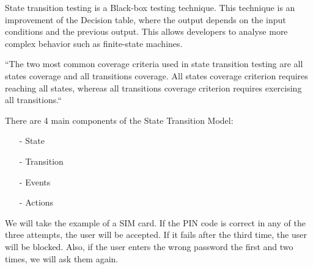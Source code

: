 State transition testing is a Black-box testing technique. This technique is an improvement of the Decision table, where the output depends on the input conditions and the previous output. This allows developers to analyse more complex behavior such as finite-state machines.

``The two most common coverage criteria used in state transition testing are all states coverage and all transitions coverage. All states coverage criterion requires reaching all states, whereas all transitions coverage criterion requires exercising all transitions.``\cite{de_souza_carvalho_coverage_2014}

\newpage

There are 4 main components of the State Transition Model:
\begin{itemize}
  \item[-] State
  \item[-] Transition
  \item[-] Events
  \item[-] Actions
\end{itemize}

We will take the example of a SIM card. If the PIN code is correct in any of the three attempts, the user will be accepted. If it fails after the third time, the user will be blocked. Also, if the user enters the wrong password the first and two times, we will ask them again.

